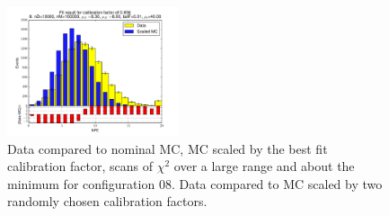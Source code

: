 \begin{figure}[htbp]
\begin{center}
\includegraphics[width=0.45\textwidth]{../FIGURES/08/FIG_Fit_result_for_calibration_factor_of_0_856.pdf} 
\caption{Data compared to nominal MC, MC scaled by the best fit calibration factor, scans of $\chi^2$ over a large range and about the minimum for configuration 08. Data compared to MC scaled by two randomly chosen calibration factors.} 
\label{tab:best_08} 
\end{center} \end{figure} 

